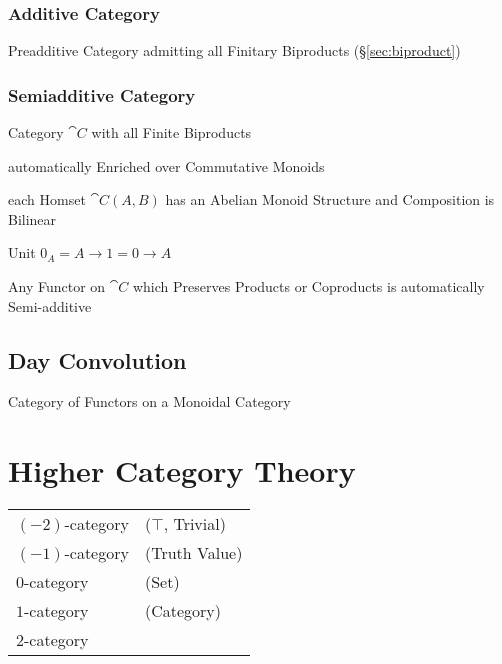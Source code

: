 \subsubsection{Additive Category}\label{sec:additive_category}

Preadditive Category admitting all Finitary Biproducts
(\S\ref{sec:biproduct})



\subsubsection{Semiadditive Category}\label{sec:semiadditive_category}

Category $\cat{C}$ with all Finite Biproducts

automatically Enriched over Commutative Monoids

each Homset $\cat{C}(A,B)$ has an Abelian Monoid Structure and
Composition is Bilinear

Unit $0_A = A \rightarrow 1 = 0 \rightarrow A$

Any Functor on $\cat{C}$ which Preserves Products or Coproducts is
automatically Semi-additive



\subsection{Day Convolution}\label{sec:day_convolution}


Category of Functors on a Monoidal Category



\section{Higher Category Theory}\label{sec:higher_category}

\begin{tabular}{l l}
  $(-2)$-category   & ($\top$, Trivial) \\
  $(-1)$-category   & (Truth Value) \\
  $0$-category      & (Set) \\
  $1$-category      & (Category) \\
  $2$-category      & \\
\end{tabular}



